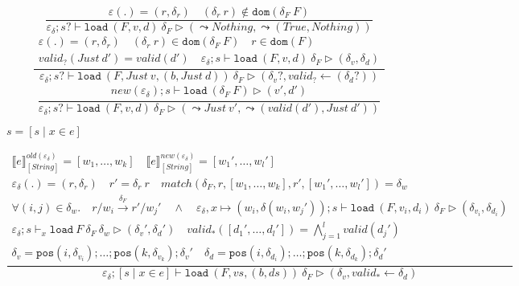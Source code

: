 \documentclass[10pt,twoside,a4paper]{article}
\theoremstyle{theorem}
\theoremstyle{lemma}
\theoremstyle{property}
\begin{document}
\begin{displaymath}
	\frac{
		\varepsilon(.) = (r,\delta_r) \quad(\delta_r ~ r) \notin \mathtt{dom}(\delta_F~F)
	}
	{\varepsilon_\delta ; s? \vdash \mathtt{load}~ (F,v,d)~ \delta_F \rhd (\leadsto Nothing,\leadsto (True,Nothing))}
\end{displaymath}
\begin{displaymath}
	\frac{\begin{array}{c}
		\varepsilon(.) = (r,\delta_r) \quad (\delta_r ~ r) \in \mathtt{dom}(\delta_F~F) \quad r \in \mathtt{dom}(F)\\
		valid_?(Just~d') = valid(d')\quad
		\varepsilon_\delta ; s \vdash \mathtt{load}~ (F,v,d)~ \delta_F \rhd (\delta_v,\delta_d)
	\end{array}}
	{\varepsilon_\delta ; s? \vdash \mathtt{load}~ (F,Just ~v,(b,Just ~d))~ \delta_F \rhd (\delta_v?,valid_? \leftarrow (\delta_d?))}
\end{displaymath}
\begin{displaymath}
	\frac{\begin{array}{c}
		new(\varepsilon_\delta) ; s \vdash \mathtt{load}~ (\delta_F~F) \rhd (v',d')
	\end{array}}
	{\varepsilon_\delta ; s? \vdash \mathtt{load}~ (F,v,d)~ \delta_F \rhd (\leadsto Just~v',\leadsto (valid(d'),Just~d'))}
\end{displaymath}

$\boxed{s = [ s \mid x \in e]}$

\begin{displaymath}
	\frac{\begin{array}{c}
		\llbracket e \rrbracket^{old(\varepsilon_\delta)}_{[String]} = [w_1,\dots,w_k] \quad
		\llbracket e \rrbracket^{new(\varepsilon_\delta)}_{[String]} = [w_1',\dots,w_l']\\
		\varepsilon_\delta(.) = (r,\delta_r) \quad r' = \delta_r ~ r \quad
		match(\delta_F,r,[w_1,\dots,w_k],r',[w_1',\dots,w_l']) = \delta_w\\
		\forall (i,j) \in \delta_w .\quad r/w_i \xrightarrow{\delta_F} r'/w_j' \quad \wedge 
		 \quad \varepsilon_\delta,x \mapsto (w_i,\delta (w_i,w_j')) ; s \vdash \mathtt{load}~ (F,v_i,d_i)~ \delta_F \rhd (\delta_{v_i},\delta_{d_i})\\
		\varepsilon_\delta ; s \vdash_x \mathtt{load}~F~ \delta_F ~\delta_w \rhd (\delta_v',\delta_d')\quad
		valid_*([d_1',\dots,d_l']) = \bigwedge_{j=1}^l valid(d_j')\\
		\delta_v = \mathtt{pos}(i,\delta_{v_i}) ; \dots ; \mathtt{pos}(k,\delta_{v_k}) ; \delta_v'\quad
		\delta_d = \mathtt{pos}(i,\delta_{d_i}) ; \dots ; \mathtt{pos}(k,\delta_{d_k}) ; \delta_d'
	\end{array}}
	{\varepsilon_\delta ; [ s \mid x \in e] \vdash \mathtt{load}~ (F,vs,(b,ds))~ \delta_F \rhd (\delta_v,valid_* \leftarrow \delta_d)}
\end{displaymath}
\end{document}
